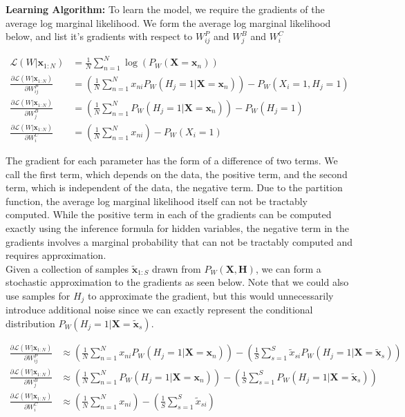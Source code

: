 \documentclass[11pt]{article}
\newcommand{\deriv}[2]{\frac{\partial{#1}}{\partial {#2}} }
\newcommand{\mbf}[1]{{\mathbf{#1}}}
\begin{document}
\textbf{Learning Algorithm:} To learn the model, we require the gradients of the average log marginal likelihood. We form the average log marginal likelihood below, and list it's gradients with respect to $W_{ij}^P$ and $W^B_j$ and $W^C_i$

\begin{align}
\label{marginal_loglik}
\mathcal{L}(W|\mbf{x}_{1:N})&=\frac{1}{N}\sum_{n=1}^N\log(P_W(\mbf{X}=\mbf{x}_n))\\
%
\label{deriv_WP}
\deriv{\mathcal{L}(W|\mbf{x}_{1:N})}{W^P_{ij}}
&= \left(\frac{1}{N}\sum_{n=1}^Nx_{ni}P_W(H_j=1|\mbf{X}=\mbf{x}_n)\right)
-P_W(X_i=1,H_j=1)\\
%
\label{deriv_WB}
\deriv{\mathcal{L}(W|\mbf{x}_{1:N})}{W^B_{j}}
&= \left(\frac{1}{N}\sum_{n=1}^NP_W(H_j=1|\mbf{X}=\mbf{x}_n)\right)
-P_W(H_j=1)\\
%
\label{deriv_WC}
\deriv{\mathcal{L}(W|\mbf{x}_{1:N})}{W^C_{i}}
&= \left(\frac{1}{N}\sum_{n=1}^Nx_{ni}\right) -P_W(X_i=1)
\end{align}

The gradient for each parameter has the form of a difference of two terms. We call the first term, which depends on the data, the positive term, and the second term, which is independent of the data, the negative term. Due to the partition function, the average log marginal likelihood itself can not be tractably computed. While the positive term in each of the gradients can be computed exactly using the inference formula for hidden variables, the negative term in the gradients involves a marginal probability that can not be tractably computed and requires approximation.\\

Given a collection of samples $\tilde{\mbf{x}}_{1:S}$ drawn from $P_W(\mbf{X},\mbf{H})$, we can form a stochastic approximation to the gradients as seen below. Note that we could also use samples for $H_j$ to approximate the gradient, but this would unnecessarily introduce additional noise since we can exactly represent the conditional distribution $P_W(H_j=1|\mbf{X}=\tilde{\mbf{x}}_s)$.

\begin{align}
\label{deriv_approx_WP}
\deriv{\mathcal{L}(W|\mbf{x}_{1:N})}{W^P_{ij}}
&\approx \left(\frac{1}{N}\sum_{n=1}^Nx_{ni}P_W(H_j=1|\mbf{X}=\mbf{x}_n)\right)
-\left(\frac{1}{S}\sum_{s=1}^S\tilde{x}_{si}P_W(H_j=1|\mbf{X}=\tilde{\mbf{x}}_s)\right)\\
%
\label{deriv_approx_WB}
\deriv{\mathcal{L}(W|\mbf{x}_{1:N})}{W^B_{j}}
&\approx \left(\frac{1}{N}\sum_{n=1}^NP_W(H_j=1|\mbf{X}=\mbf{x}_n)\right)
-\left(\frac{1}{S}\sum_{s=1}^SP_W(H_j=1|\mbf{X}=\tilde{\mbf{x}}_s)\right)\\
%
\label{deriv_approx_WC}
\deriv{\mathcal{L}(W|\mbf{x}_{1:N})}{W^C_{i}}
&\approx \left(\frac{1}{N}\sum_{n=1}^N x_{ni}\right)
-\left(\frac{1}{S}\sum_{s=1}^S \tilde{x}_{si}\right)
\end{align}
\end{document}
